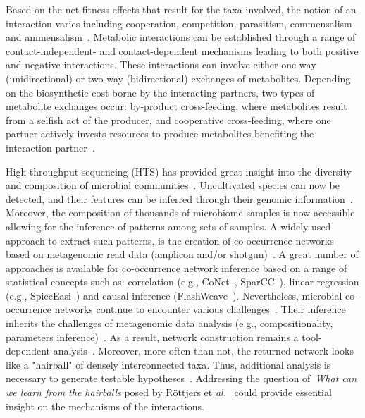 \documentclass[sn-mathphys,Numbered]{sn-jnl}  %
\theoremstyle{thmstyleone}%
\theoremstyle{thmstyletwo}%
\theoremstyle{thmstylethree}%
\begin{document}
    Based on the net fitness effects that result for the taxa involved, the notion of an interaction varies including cooperation, competition, parasitism, commensalism and ammensalism~\cite{faust2012microbialReviewInteractions}.
    Metabolic interactions can be established through a range of contact-independent- and contact-dependent mechanisms leading to both positive and negative interactions. 
    These interactions can involve either one-way (unidirectional) or two-way (bidirectional) exchanges of metabolites.
    Depending on the biosynthetic cost borne by the interacting partners, two types of metabolite exchanges occur: by-product cross-feeding, where metabolites result from a selfish act of the producer, and cooperative cross-feeding, where one partner actively invests resources to produce metabolites benefiting the interaction partner~\cite{d2018ecology}.


    High-throughput sequencing (HTS) has provided great insight into the diversity and composition of microbial communities~\cite{elixir_microbiome}. %
    Uncultivated species can now be detected, and their features can be inferred through their genomic information~\cite{hug2016new}.
    Moreover, the composition of thousands of microbiome samples is now accessible allowing for the inference of patterns among sets of samples.
    A widely used approach to extract such patterns, is the creation of co-occurrence networks based on metagenomic read data (amplicon and/or shotgun)~\cite{matchado2021network}. 
    A great number of approaches is available for co-occurrence network inference based on a range of statistical concepts such as: correlation (e.g., CoNet~\cite{faust2012microbial}, SparCC~\cite{friedman2012inferring}), linear regression (e.g., SpiecEasi~\cite{kurtz2015sparse}) and causal inference (FlashWeave~\cite{flashweave_cite}).
    Nevertheless, microbial co-occurrence networks continue to encounter various challenges~\cite{faust2021open}.
    Their inference inherits the challenges of metagenomic data analysis (e.g., compositionality, parameters inference)~\cite{cao2017inferring}.
    As a result, network construction remains a tool-dependent analysis~\cite{kishore2023inferring, weiss2016correlation}.
    Moreover, more often than not, the returned network looks like a "hairball" of densely interconnected taxa.
    Thus, additional analysis is necessary to generate testable hypotheses~\cite{faust2021open}.
    Addressing the question of~\textit{What can we learn from the hairballs} posed by R{\"o}ttjers et \textit{al.}~\cite{rottjers2018hairballs} could provide essential insight on the mechanisms of the interactions.
\end{document}
